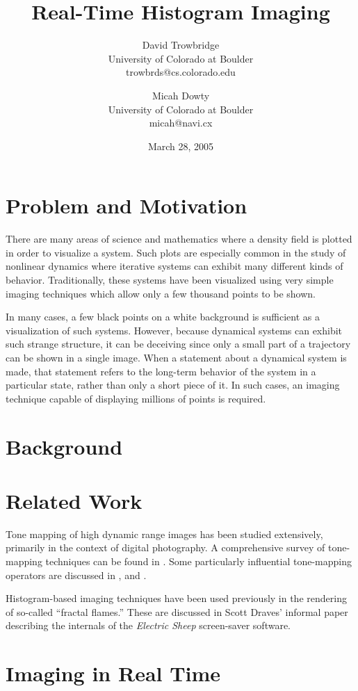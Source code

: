 \documentclass[letterpaper, 12pt]{article}
\title{Real-Time Histogram Imaging}
\author{
	David Trowbridge \\ University of Colorado at Boulder \\ trowbrds@cs.colorado.edu
\and
	Micah Dowty \\ University of Colorado at Boulder \\ micah@navi.cx
}
\date{March 28, 2005}
\begin{document}
\maketitle

\section{Problem and Motivation}
There are many areas of science and mathematics where a density field is plotted in order
to visualize a system.  Such plots are especially common in the study of nonlinear dynamics
where iterative systems can exhibit many different kinds of behavior.  Traditionally, these
systems have been visualized using very simple imaging techniques which allow only a few
thousand points to be shown.

In many cases, a few black points on a white background is sufficient as a visualization
of such systems.  However, because dynamical systems can exhibit such strange structure,
it can be deceiving since only a small part of a trajectory can be shown in a single image.
When a statement about a dynamical system is made, that statement refers to the long-term
behavior of the system in a particular state, rather than only a short piece of it. In such
cases, an imaging technique capable of displaying millions of points is required.

\section{Background}

\section{Related Work}
Tone mapping of high dynamic range images has been studied extensively, primarily in the
context of digital photography. A comprehensive survey of tone-mapping techniques can be
found in \cite{kd}. Some particularly influential tone-mapping operators are discussed
in \cite{jt}, \cite{jtjhbg} and \cite{gw}.

Histogram-based imaging techniques have been used previously in the rendering of so-called
``fractal flames.'' These are discussed in Scott Draves' informal paper describing the
internals of the \emph{Electric Sheep} screen-saver software\cite{sd}.

\section{Imaging in Real Time}
\end{document}
